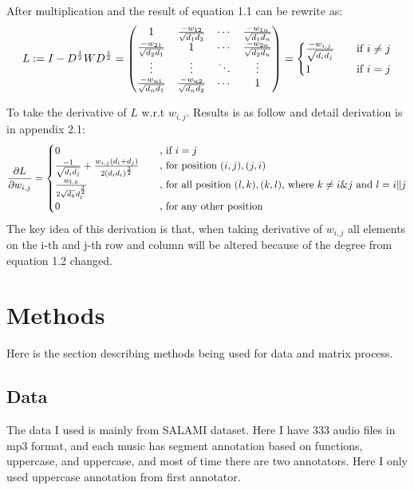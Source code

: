 \documentclass[final]{siamltexmm}
\begin{document}
After multiplication and the result of equation 1.1 can be rewrite as:
\begin{equation}
L := I - D^{1 \over 2}W D^{1 \over 2} =
\begin{pmatrix}
  1 & {-w_{12} \over \sqrt{d_1d_2}} & \cdots & {-w_{1n} \over \sqrt{d_1d_n}} \\
  {-w_{21} \over \sqrt{d_2d_1}} & 1 & \cdots & {-w_{2n} \over \sqrt{d_2d_n}} \\
  \vdots  & \vdots  & \ddots & \vdots  \\
  {-w_{n1} \over \sqrt{d_nd_1}} & {-w_{n2} \over \sqrt{d_nd_2}} & \cdots & 1 \\
\end{pmatrix}
=
\begin{cases}
  {-w_{i,j} \over \sqrt{d_id_j}}       & \quad \text{if } i \neq j\\
  1   & \quad \text{if } i = j\\
\end{cases}
\end{equation}

To take the derivative of $L$ w.r.t $w_{i,j}$. Results is as follow and detail derivation is in appendix 2.1:
\begin{equation}
{\partial L \over \partial w_{i,j}} =
\begin{cases}
  0       & \quad \text{, if $i = j$}\\
  {-1 \over \sqrt{d_id_j}} + {w_{i,j}(d_i+d_j) \over 2(d_id_i)^{3\over 2}} & \quad \text{, for position $(i,j), (j,i)$} \\
  {w_{l,k} \over 2\sqrt{d_k}d_l^{3\over2}}       & \quad \text{, for all position $(l,k), (k,l)$, where $k \neq i \& j$ and $l = i\|j$}\\
  0 & \quad \text{, for any other position} \\
\end{cases}
\end{equation}
The key idea of this derivation is that, when taking derivative of $w_{i,j}$ all elements on the i-th and j-th row and column will be altered because of the degree from equation 1.2 changed.

\section{Methods}
Here is the section describing methods being used for data and matrix process.

\subsection{Data}
The data I used is mainly from SALAMI dataset. Here I have 333 audio files in mp3 format, and each music has segment annotation based on functions, uppercase, and uppercase, and most of time there are two annotators. Here I only used uppercase annotation from first annotator.
\end{document}

